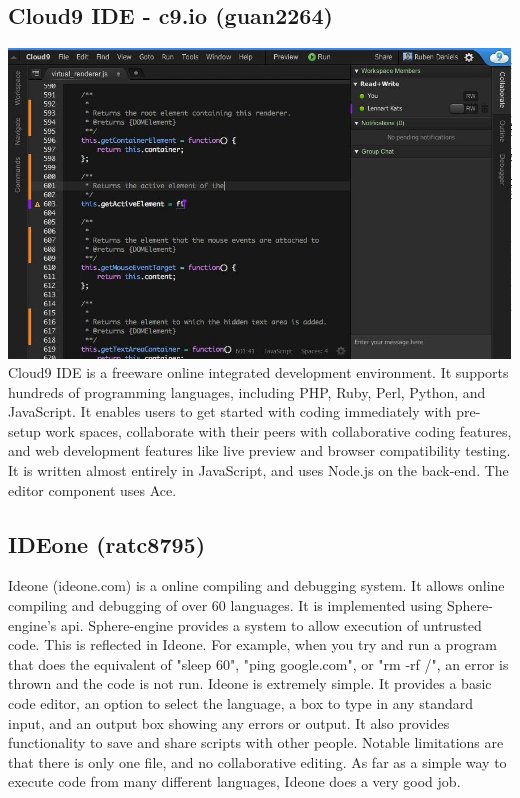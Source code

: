 \documentclass[11pt]{report}
\begin{document}
\subsection{Cloud9 IDE - c9.io (guan2264)}
\includegraphics[width=\textwidth]{cloud9}
Cloud9 IDE is a freeware online integrated development environment. It supports hundreds of programming languages, including PHP, Ruby, Perl, Python, and JavaScript. It enables users to get started with coding immediately with pre-setup work spaces, collaborate with their peers with collaborative coding features, and web development features like live preview and browser compatibility testing. It is written almost entirely in JavaScript, and uses Node.js on the back-end. The editor component uses Ace. 

\subsection{IDEone (ratc8795)}
Ideone (ideone.com) is a online compiling and debugging system. It allows online compiling and debugging of over 60 languages. It is implemented using Sphere-engine's api. Sphere-engine provides a system to allow execution of untrusted code. This is reflected in Ideone. For example, when you try and run a program that does the equivalent of "sleep 60", "ping google.com", or "rm -rf /", an error is thrown and the code is not run. Ideone is extremely simple. It provides a basic code editor, an option to select the language, a box to type in any standard input, and an output box showing any errors or output. It also provides functionality to save and share scripts with other people. Notable limitations are that there is only one file, and no collaborative editing. As far as a simple way to execute code from many different languages, Ideone does a very good job.
\end{document}
